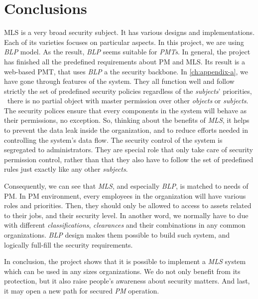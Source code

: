 
\chapter{Conclusions} %

\label{ch:conclusion} 

MLS is a very broad security subject.
It has various designs and implementations.
Each of its varieties focuses on particular aspects.
In this project, we are using \emph{BLP} model.
As the result, \emph{BLP} seems suitable for \emph{PMTs}.
In general, the project has finished all the predefined requirements about PM and MLS.
Its result is a web-based PMT, that uses \emph{BLP} a the security backbone.
In \autoref{ch:appendix-a}, we have gone through features of the system.
They all function well and follow strictly the set of predefined security policies regardless of the \emph{subjects}' priorities, \ie\ there is no partial object with master permission over other \emph{objects} or \emph{subjects}.
The security polices ensure that every components in the system will behave as their permissions, no exception.
So, thinking about the benefits of \emph{MLS}, it helps to prevent the data leak inside the organization, and to reduce efforts needed in controlling the system's data flow.
The security control of the system is segregated to administrators.
They are special role that only take care of security permission control, rather than that they also have to follow the set of predefined rules just exactly like any other \emph{subjects}.

Consequently, we can see that \emph{MLS}, and especially \emph{BLP}, is matched to needs of PM.
In PM environment, every employees in the organization will have various roles and priorities.
Then, they should only be allowed to access to assets related to their jobs, and their security level.
In another word, we normally have to due with different \emph{classifications}, \emph{clearances} and their combinations in any common organizations.
\emph{BLP} design makes them possible to build such system, and logically full-fill the security requirements.

In conclusion, the project shows that it is possible to implement a \emph{MLS} system which can be used in any sizes organizations.
We do not only benefit from its protection, but it also raise people's awareness about security matters.
And last, it may open a new path for secured \emph{PM} operation.
